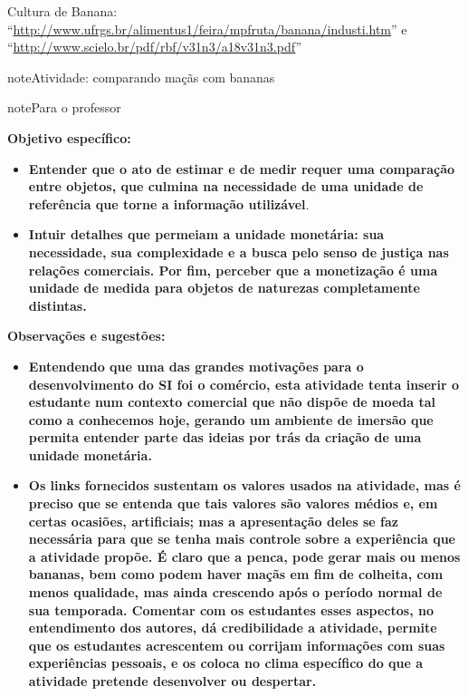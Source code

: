 Cultura de Banana: “\url{http://www.ufrgs.br/alimentus1/feira/mpfruta/banana/industi.htm}” e “\url{http://www.scielo.br/pdf/rbf/v31n3/a18v31n3.pdf}”
\label{\detokenize{NO103-0:ativ-unidades-de-medida-macas-e-bananas}}
\begin{sphinxadmonition}{note}{Atividade: comparando maçãs com bananas}

\begin{sphinxadmonition}{note}{Para o professor}

\textbf{Objetivo específico:}
\begin{itemize}
\item {} 
\textbf{Entender que o ato de estimar e de medir requer uma comparação entre objetos, que culmina na necessidade de uma unidade de referência que torne a informação utilizável}.

\item {} 
\textbf{Intuir detalhes que permeiam a unidade monetária: sua necessidade, sua complexidade e a busca pelo senso de justiça nas relações comerciais. Por fim, perceber que a monetização é uma unidade de medida para objetos de naturezas completamente distintas.}

\end{itemize}

\textbf{Observações e sugestões:}
\begin{itemize}
\item {} 
\textbf{Entendendo que uma das grandes motivações para o desenvolvimento do SI foi o comércio, esta atividade tenta inserir o estudante num contexto comercial que não dispõe de moeda tal como a conhecemos hoje, gerando um ambiente de imersão que permita entender parte das ideias por trás da criação de uma unidade monetária.}

\item {} 
\textbf{Os links fornecidos sustentam os valores usados na atividade, mas é preciso que se entenda que tais valores são valores médios e, em certas ocasiões, artificiais; mas a apresentação deles se faz necessária para que se tenha mais controle sobre a experiência que a atividade propõe. É claro que a penca, pode gerar mais ou menos bananas, bem como podem haver maçãs em fim de colheita, com menos qualidade, mas ainda crescendo após o período normal de sua temporada. Comentar com os estudantes esses aspectos, no entendimento dos autores, dá credibilidade a atividade, permite que os estudantes acrescentem ou corrijam informações com suas experiências pessoais, e os coloca no clima específico do que a atividade pretende desenvolver ou despertar.}


\end{itemize}
\end{sphinxadmonition}
\end{sphinxadmonition}
